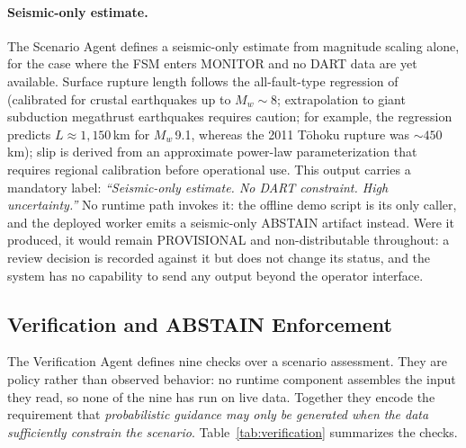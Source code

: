 \documentclass{article}
\begin{document}
\paragraph{Seismic-only estimate.}
The Scenario Agent defines a seismic-only estimate from magnitude
scaling alone, for the case where the FSM enters MONITOR and no DART
data are yet available.  Surface rupture length follows the all-fault-type regression
of~\citet{wells1994new} (calibrated for crustal earthquakes up to
$M_w {\sim}8$; extrapolation to giant
subduction megathrust earthquakes requires caution; for example,
the regression predicts $L \approx 1{,}150$\,km for $M_w$\,9.1,
whereas the 2011 T\={o}hoku rupture was ${\sim}450$\,km);
slip is derived from an approximate power-law parameterization
that requires regional calibration before operational use.
This output carries a mandatory label: \emph{``Seismic-only
estimate. No DART constraint. High uncertainty.''} No runtime path
invokes it: the offline demo script is its only caller, and the
deployed worker emits a seismic-only ABSTAIN artifact instead.  Were
it produced, it would remain PROVISIONAL and non-distributable
throughout: a review decision is
recorded against it but does not change its status, and the system has
no capability to send any output beyond the operator interface.

\subsection{Verification and ABSTAIN Enforcement}
\label{sec:verification}

The Verification Agent defines nine checks over a scenario assessment.
They are policy rather than observed behavior: no runtime component
assembles the input they read, so none of the nine has run on live
data. Together they encode the requirement that
\emph{probabilistic guidance may only be generated when the data
sufficiently constrain the scenario}. Table~\ref{tab:verification}
summarizes the checks.
\end{document}
